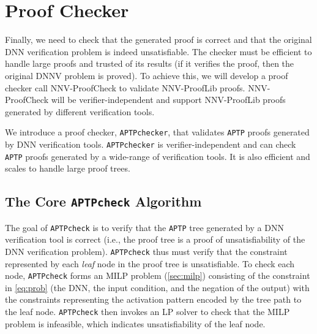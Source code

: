\documentclass[oneside,11pt,dvipsnames]{book}
\newcommand{\prooflang}{\textsf{NNV-ProofLib}}
\newcommand{\proofcheck}{\textsf{NNV-ProofCheck}}
\newcommand{\nnproofcheck}{\texttt{APTPcheck}}
\newcommand{\nnproofchecker}{\texttt{APTPchecker}}
\newcommand{\nnproofformat}{\texttt{APTP}}
\begin{document}
\section{Proof Checker}\label{sec:proofchecking}
Finally, we need to check that the generated proof is correct and that the original DNN verification problem is indeed unsatisfiable. The checker must be efficient to handle large proofs and trusted of its results (if it verifies the proof, then the original DNNV problem is proved).
To achieve this, we will develop a proof checker call \proofcheck{} to validate \prooflang{} proofs.
\proofcheck{} will be verifier-independent and support \prooflang{} proofs generated by different verification tools. 



We introduce a proof checker, \nnproofchecker{}, that validates \nnproofformat{} proofs generated by DNN verification tools.
\nnproofchecker{} is verifier-independent and can check \nnproofformat{} proofs generated by a wide-range of verification tools.
It is also efficient and scales to handle large proof trees.

\subsection{The Core \nnproofcheck{} Algorithm}


The goal of \nnproofcheck{} is to verify that the \nnproofformat{} tree generated by a DNN verification tool is correct (i.e., the proof tree is a proof of unsatisfiability of the DNN verification problem).
\nnproofcheck{} thus must verify that the constraint represented by each \emph{leaf} node in the proof tree is unsatisfiable. To check each node, \nnproofcheck{} forms an MILP problem (\autoref{sec:milp}) consisting of the constraint in \autoref{eq:prob} (the DNN, the input condition, and the negation of the output) with the constraints representing the activation pattern encoded by the tree path to the leaf node. \nnproofcheck{} then invokes an LP solver to check that the MILP problem is infeasible, which indicates unsatisfiability of the leaf node. 
\end{document}
